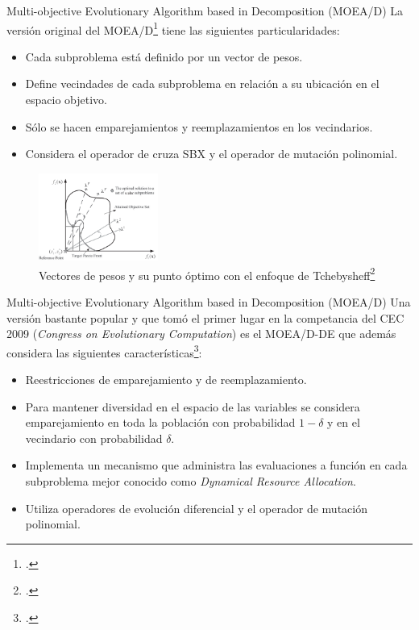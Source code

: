 \documentclass{beamer}
\begin{document}
\begin{frame}{Multi-objective Evolutionary Algorithm based in Decomposition (MOEA/D)}
\scriptsize
La versión original del MOEA/D\footcite{ishibuchi1998multi} tiene las siguientes particularidades:
\begin{itemize}
\scriptsize
    \item Cada subproblema está definido por un vector de pesos.
    \item Define vecindades de cada subproblema en relación a su ubicación en el espacio objetivo.
    \item Sólo se hacen emparejamientos y reemplazamientos en los vecindarios.
    \item Considera el operador de cruza SBX y el operador de mutación polinomial.
\end{itemize}
\begin{figure}[H]
\centering
\includegraphics[width=0.35\textwidth]{Images/moead_diagrama.png}
\caption{\scriptsize Vectores de pesos y su punto óptimo con el enfoque de Tchebysheff\footcite{Joel:MOEAD_Adaptative}}
\end{figure}

\end{frame}

\begin{frame}{Multi-objective Evolutionary Algorithm based in Decomposition (MOEA/D)}
\scriptsize
Una versión bastante popular y que tomó el primer lugar en la competancia del CEC 2009 (\textit{Congress on Evolutionary Computation}) es el  MOEA/D-DE que además considera las siguientes características\footcite{li2009multiobjective}: 
\begin{itemize}
\scriptsize
    \item Reestricciones de emparejamiento y de reemplazamiento.
    \item Para mantener diversidad en el espacio de las variables se considera emparejamiento en toda la población con probabilidad $1 - \delta$ y en el vecindario con probabilidad $\delta$. 
    \item Implementa un mecanismo que administra las evaluaciones a función en cada subproblema mejor conocido como \textit{Dynamical Resource Allocation}.
    \item Utiliza operadores de evolución diferencial y el operador de mutación polinomial.
\end{itemize}
\end{frame}
\end{document}
